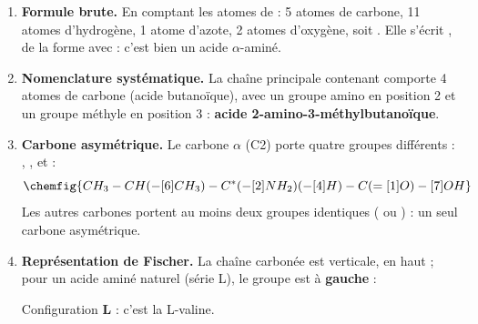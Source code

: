 \documentclass[11pt]{article}
\begin{document}
\begin{corrige}
\begin{enumerate}
\item \textbf{Formule brute.} En comptant les atomes de  : 5 atomes de carbone, 11 atomes d'hydrogène, 1 atome d'azote, 2 atomes d'oxygène, soit . Elle s'écrit , de la forme  avec  : c'est bien un acide $\alpha$-aminé.
\item \textbf{Nomenclature systématique.} La chaîne principale contenant  comporte 4 atomes de carbone (acide butanoïque), avec un groupe amino en position 2 et un groupe méthyle en position 3 : \textbf{acide 2-amino-3-méthylbutanoïque}.
\item \textbf{Carbone asymétrique.} Le carbone $\alpha$ (C2) porte quatre groupes différents : , ,  et  :
\[ \chemfig{CH_3-CH(-[6]CH_3)-C^{*}(-[2]NH_2)(-[4]H)-C(=[1]O)-[7]OH} \]
Les autres carbones portent au moins deux groupes identiques ( ou ) : un seul carbone asymétrique.
\item \textbf{Représentation de Fischer.} La chaîne carbonée est verticale,  en haut ; pour un acide aminé naturel (série L), le groupe  est à \textbf{gauche} :
\begin{center}
\end{center}
Configuration \textbf{L} : c'est la L-valine.
\end{enumerate}
\end{corrige}
\end{document}

